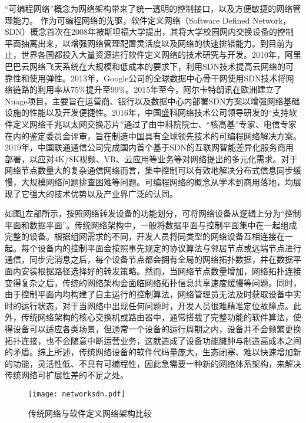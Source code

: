 “可编程网络”概念为网络架构带来了统一透明的控制接口，以及方便敏捷的网络管理能力。
作为可编程网络的先驱，软件定义网络（Software Defined Network，SDN）概念首次在2008年被斯坦福大学提出，其将大学校园网内交换设备的控制平面抽离出来，以增强网络管理配置灵活度以及网络的快速排错能力。到目前为止，世界各国都投入大量资源进行软件定义网络的技术研究与开发。2010年，阿里巴巴云网络飞天系统在大规模和低成本的要求下，利用SDN技术提高云网络的可靠性和使用弹性。2013年，Google公司的全球数据中心骨干网使用SDN技术将网络链路的利用率从75\%提升至99\%。2015年至今，阿尔卡特朗讯在欧洲建立了Nuage\cite{nuagenetworks}项目，主要旨在运营商、银行以及数据中心内部署SDN方案以增强网络基础设施的性能以及开发便捷性。2016年，中国盛科网络技术公司领导研发的“支持软件定义网络千兆以太网交换芯片”通过了由中科院院士、“核高基”专家、电信专家在内的鉴定委员会评审，旨在制造中国具有全球领先技术的可编程网络解决方案。2019年，中国联通通信公司完成国内首个基于SDN的互联网智能差异化服务商用部署，以应对4K/8K视频、VR、云应用等业务等对网络提出的多元化需求。对于网络节点数量大的复杂通信网络而言，集中控制可以有效地解决分布式信息同步缓慢，大规模网络问题排查困难等问题。可编程网络的概念从学术到商用落地，均展现了它强大的技术优势以及产业界广泛的认同。


\label{chap112}


如图\ref{fig:networksdn}左部所示，按照网络转发设备的功能划分，可将网络设备从逻辑上分为“控制平面和数据平面”。传统网络架构中，一般将数据平面与控制平面集中在一起组成完整的设备。根据组网需求的不同，开发人员将同类型的网络设备互相连接在一起。每个设备内的控制平面会按照事先规定的协议算法与邻居节点或远端节点进行通信，同步完消息之后，每个设备节点都会拥有全局的网络拓扑数据，并在数据平面内安装根据路径选择好的转发策略。然而，当网络节点数量增加，网络拓扑连接变得复杂之后，传统的网络架构会面临网络拓扑信息共享速度缓慢等问题。同时，由于控制平面内均构建了自主运行的控制算法，网络管理员无法及时获取设备中实时的运行状态，对于当网络中出现任何问题时，开发人员很难精准定位故障点。此外，传统网络架构的核心交换机或路由器中，通常搭载了完整功能的软件算法，使得设备可以适应各类场景，但通常一个设备的运行周期之内，设备并不会频繁更换拓扑连接，也不会随意中断运营业务，这就造成了设备功能臃肿与制造高成本之间的矛盾。综上所述，传统网络设备的软件代码量庞大，生态闭塞、难以快速增加新的功能，灵活性低、不具有可编程性，因此急需要一种新的网络体系架构，来解决传统网络可扩展性差的不足之处。

\begin{figure}[!ht]
	\centering 
	\vspace{-1.5mm} 
	\texttt{[image: networksdn.pdf]}
	\caption{传统网络与软件定义网络架构比较} \label{fig:networksdn}
\end{figure}

